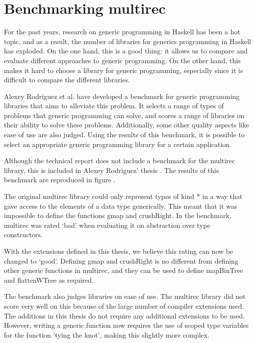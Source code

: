 \chapter{Benchmarking multirec}

For the past years, research on generic programming in Haskell has
been a hot topic, and as a result, the number of libraries for
generics programming in Haskell has exploded. On the one hand, this
is a good thing: it allows us to compare and evaluate different
approaches to generic programming. On the other hand, this makes it
hard to choose a library for generic programming, especially since it
is difficult to compare the different libraries.

Alexey Rodriguez et al. \cite{benchmark} have developed a benchmark
for generic programming libraries that aims to alleviate this problem.
It selects a range of types of problems that generic programming can
solve, and scores a range of libraries on their ability to solve these
problems. Additionally, some other quality aspects like ease of use
are also judged. Using the results of this benchmark, it is possible
to select an appropriate generic programming library for a certain
application.

Although the technical report does not include a benchmark for the
multirec \cite{multirec} library, this is included in Alexey
Rodriguez' thesis \cite{thesis_alexey}. The results of this benchmark
are reproduced in figure .



The original multirec library could only represent types of kind * in
a way that gave access to the elements of a data type generically.
This meant that it was impossible to define the functions gmap and
crushRight. In the benchmark, multirec was rated `bad' when evaluating
it on abstraction over type constructors.

With the extensions defined in this thesis, we believe this rating can
now be changed to `good'. Defining gmap and crushRight is no different
from defining other generic functions in multirec, and they can be
used to define mapBinTree and flattenWTree as required.

The benchmark also judges libraries on ease of use. The multirec
library did not score very well on this because of the large number of
compiler extensions used. The additions in this thesis do not require
any additional extensions to be used. However, writing a generic
function now requires the use of scoped type variables for the
function 'tying the knot', making this slightly more complex.

